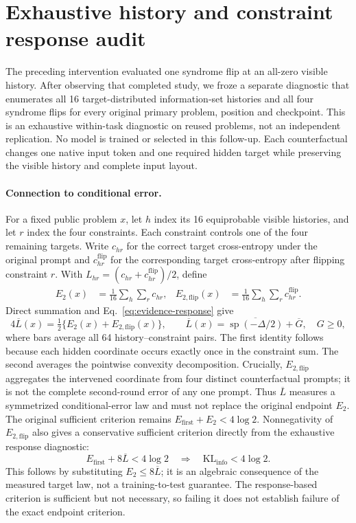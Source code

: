 \section{Exhaustive history and constraint response audit}
\label{app:history-response}
The preceding intervention evaluated one syndrome flip at an all-zero visible
history. After observing that completed study, we froze a separate diagnostic
that enumerates all 16 target-distributed information-set histories and all
four syndrome flips for every original primary problem, position and
checkpoint. This is an exhaustive within-task diagnostic on reused problems,
not an independent replication. No model is trained or selected in this
follow-up. Each counterfactual changes one native input token and one required
hidden target while preserving the visible history and complete input layout.

\paragraph{Connection to conditional error.}
For a fixed public problem $x$, let $h$ index its 16 equiprobable visible
histories, and let $r$ index the four constraints. Each constraint controls
one of the four remaining targets. Write $c_{hr}$ for the correct target
cross-entropy under the original prompt and $c^{\mathrm{flip}}_{hr}$ for
the corresponding target cross-entropy after flipping constraint $r$.
With $L_{hr}=(c_{hr}+c^{\mathrm{flip}}_{hr})/2$, define
\begin{align}
 E_2(x)&=\frac1{16}\sum_h\sum_r c_{hr}, &
 E_{2,\mathrm{flip}}(x)&=\frac1{16}\sum_h\sum_r
 c^{\mathrm{flip}}_{hr}.
\end{align}
Direct summation and Eq.~\eqref{eq:evidence-response} give
\begin{equation}
 4\overline L(x)=\tfrac12\{E_2(x)+E_{2,\mathrm{flip}}(x)\},\qquad
 \overline L(x)=\overline{\operatorname{sp}(-\Delta/2)}+\overline G,
 \quad G\ge0,
 \label{eq:exhaustive-response}
\end{equation}
where bars average all 64 history--constraint pairs. The first identity follows
because each hidden coordinate occurs exactly once in the constraint sum.
The second averages the pointwise convexity decomposition. Crucially,
$E_{2,\mathrm{flip}}$ aggregates the intervened coordinate from four distinct
counterfactual prompts; it is not the complete second-round error of any one
prompt. Thus $\overline L$ measures a symmetrized conditional-error law and
must not replace the original endpoint $E_2$. The original sufficient
criterion remains $E_{\mathrm{first}}+E_2<4\log2$.
Nonnegativity of $E_{2,\mathrm{flip}}$ also gives a conservative sufficient
criterion directly from the exhaustive response diagnostic:
\begin{equation}
 E_{\mathrm{first}}+8\overline L<4\log2
 \quad\Longrightarrow\quad
 \mathrm{KL}_{\mathrm{info}}<4\log2.
 \label{eq:response-certificate}
\end{equation}
This follows by substituting $E_2\le8\overline L$; it is an algebraic
consequence of the measured target law, not a training-to-test guarantee.
The response-based criterion is sufficient but not necessary, so failing it
does not establish failure of the exact endpoint criterion.


